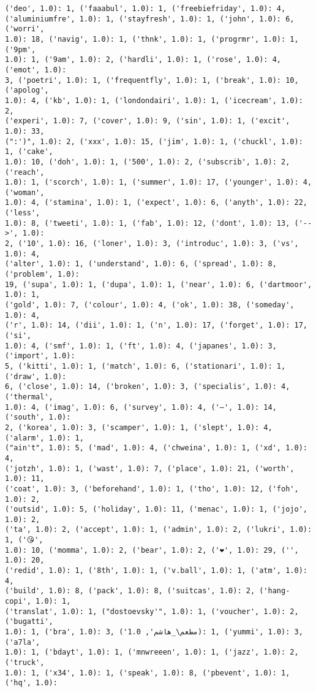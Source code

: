 \documentclass[11pt]{article}
\begin{document}
\begin{Verbatim}[commandchars=\\\{\}]
('deo', 1.0): 1, ('faaabul', 1.0): 1, ('freebiefriday', 1.0): 4,
('aluminiumfre', 1.0): 1, ('stayfresh', 1.0): 1, ('john', 1.0): 6, ('worri',
1.0): 18, ('navig', 1.0): 1, ('thnk', 1.0): 1, ('progrmr', 1.0): 1, ('9pm',
1.0): 1, ('9am', 1.0): 2, ('hardli', 1.0): 1, ('rose', 1.0): 4, ('emot', 1.0):
3, ('poetri', 1.0): 1, ('frequentfly', 1.0): 1, ('break', 1.0): 10, ('apolog',
1.0): 4, ('kb', 1.0): 1, ('londondairi', 1.0): 1, ('icecream', 1.0): 2,
('experi', 1.0): 7, ('cover', 1.0): 9, ('sin', 1.0): 1, ('excit', 1.0): 33,
(":')", 1.0): 2, ('xxx', 1.0): 15, ('jim', 1.0): 1, ('chuckl', 1.0): 1, ('cake',
1.0): 10, ('doh', 1.0): 1, ('500', 1.0): 2, ('subscrib', 1.0): 2, ('reach',
1.0): 1, ('scorch', 1.0): 1, ('summer', 1.0): 17, ('younger', 1.0): 4, ('woman',
1.0): 4, ('stamina', 1.0): 1, ('expect', 1.0): 6, ('anyth', 1.0): 22, ('less',
1.0): 8, ('tweeti', 1.0): 1, ('fab', 1.0): 12, ('dont', 1.0): 13, ('-->', 1.0):
2, ('10', 1.0): 16, ('loner', 1.0): 3, ('introduc', 1.0): 3, ('vs', 1.0): 4,
('alter', 1.0): 1, ('understand', 1.0): 6, ('spread', 1.0): 8, ('problem', 1.0):
19, ('supa', 1.0): 1, ('dupa', 1.0): 1, ('near', 1.0): 6, ('dartmoor', 1.0): 1,
('gold', 1.0): 7, ('colour', 1.0): 4, ('ok', 1.0): 38, ('someday', 1.0): 4,
('r', 1.0): 14, ('dii', 1.0): 1, ('n', 1.0): 17, ('forget', 1.0): 17, ('si',
1.0): 4, ('smf', 1.0): 1, ('ft', 1.0): 4, ('japanes', 1.0): 3, ('import', 1.0):
5, ('kitti', 1.0): 1, ('match', 1.0): 6, ('stationari', 1.0): 1, ('draw', 1.0):
6, ('close', 1.0): 14, ('broken', 1.0): 3, ('specialis', 1.0): 4, ('thermal',
1.0): 4, ('imag', 1.0): 6, ('survey', 1.0): 4, ('–', 1.0): 14, ('south', 1.0):
2, ('korea', 1.0): 3, ('scamper', 1.0): 1, ('slept', 1.0): 4, ('alarm', 1.0): 1,
("ain't", 1.0): 5, ('mad', 1.0): 4, ('chweina', 1.0): 1, ('xd', 1.0): 4,
('jotzh', 1.0): 1, ('wast', 1.0): 7, ('place', 1.0): 21, ('worth', 1.0): 11,
('coat', 1.0): 3, ('beforehand', 1.0): 1, ('tho', 1.0): 12, ('foh', 1.0): 2,
('outsid', 1.0): 5, ('holiday', 1.0): 11, ('menac', 1.0): 1, ('jojo', 1.0): 2,
('ta', 1.0): 2, ('accept', 1.0): 1, ('admin', 1.0): 2, ('lukri', 1.0): 1, ('😘',
1.0): 10, ('momma', 1.0): 2, ('bear', 1.0): 2, ('❤', 1.0): 29, ('️', 1.0): 20,
('redid', 1.0): 1, ('8th', 1.0): 1, ('v.ball', 1.0): 1, ('atm', 1.0): 4,
('build', 1.0): 8, ('pack', 1.0): 8, ('suitcas', 1.0): 2, ('hang-copi', 1.0): 1,
('translat', 1.0): 1, ("dostoevsky'", 1.0): 1, ('voucher', 1.0): 2, ('bugatti',
1.0): 1, ('bra', 1.0): 3, ('مطعم\_هاشم', 1.0): 1, ('yummi', 1.0): 3, ('a7la',
1.0): 1, ('bdayt', 1.0): 1, ('mnwreeen', 1.0): 1, ('jazz', 1.0): 2, ('truck',
1.0): 1, ('x34', 1.0): 1, ('speak', 1.0): 8, ('pbevent', 1.0): 1, ('hq', 1.0):

\end{Verbatim}
\end{document}
